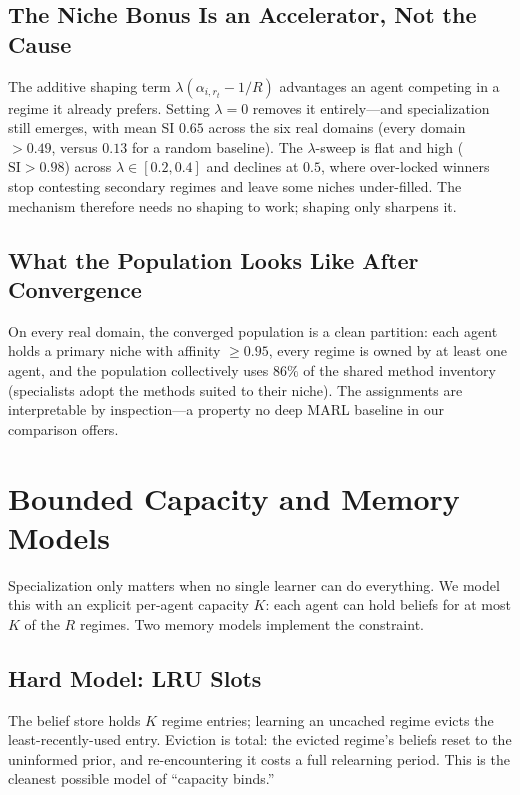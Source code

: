 \documentclass[11pt]{article}
\newcommand{\SI}{\mathrm{SI}}
\begin{document}
\subsection{The Niche Bonus Is an Accelerator, Not the Cause}

The additive shaping term $\lambda(\alpha_{i,r_t} - 1/R)$ advantages an agent
competing in a regime it already prefers. Setting $\lambda = 0$ removes it
entirely---and specialization still emerges, with mean SI $0.65$ across the six
real domains (every domain $> 0.49$, versus $0.13$ for a random baseline). The
$\lambda$-sweep is flat and high ($\SI > 0.98$) across $\lambda \in [0.2,0.4]$
and declines at $0.5$, where over-locked winners stop contesting secondary
regimes and leave some niches under-filled. The mechanism therefore needs no
shaping to work; shaping only sharpens it.

\subsection{What the Population Looks Like After Convergence}

On every real domain, the converged population is a clean partition: each agent
holds a primary niche with affinity $\ge 0.95$, every regime is owned by at
least one agent, and the population collectively uses $86\%$ of the shared
method inventory (specialists adopt the methods suited to their niche). The
assignments are interpretable by inspection---a property no deep MARL baseline
in our comparison offers.

\section{Bounded Capacity and Memory Models}
\label{sec:capacity}

Specialization only matters when no single learner can do everything. We model
this with an explicit per-agent capacity $K$: each agent can hold beliefs for at
most $K$ of the $R$ regimes. Two memory models implement the constraint.

\subsection{Hard Model: LRU Slots}

The belief store holds $K$ regime entries; learning an uncached regime evicts
the least-recently-used entry. Eviction is total: the evicted regime's beliefs
reset to the uninformed prior, and re-encountering it costs a full relearning
period. This is the cleanest possible model of ``capacity binds.''
\end{document}

